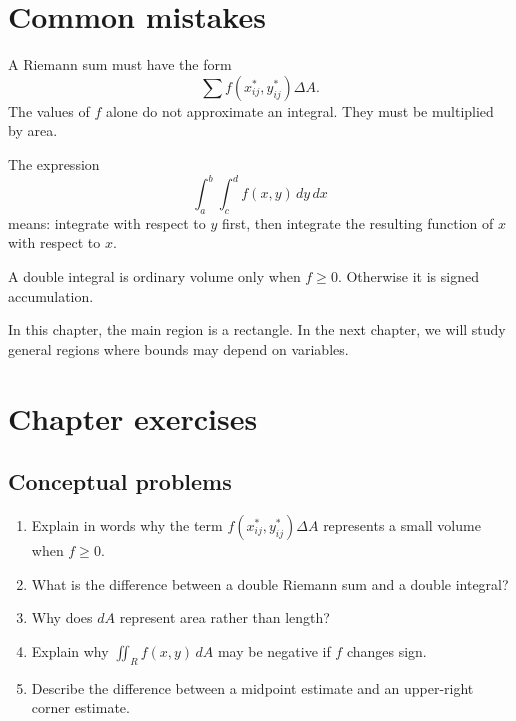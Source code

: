 \documentclass[11pt]{article}
\newcommand{\dA}{\,dA}
\newcommand{\dd}{\,d}
\begin{document}
\section{Common mistakes}

\begin{warningbox}
A Riemann sum must have the form
\[
\sum f(x_{ij}^*,y_{ij}^*)\Delta A.
\]
The values of $f$ alone do not approximate an integral. They must be multiplied by area.
\end{warningbox}

\begin{warningbox}
The expression
\[
\int_a^b\int_c^d f(x,y)\dd y\dd x
\]
means: integrate with respect to $y$ first, then integrate the resulting function of $x$ with respect to $x$.
\end{warningbox}

\begin{warningbox}
A double integral is ordinary volume only when $f\ge 0$. Otherwise it is signed accumulation.
\end{warningbox}

\begin{warningbox}
In this chapter, the main region is a rectangle. In the next chapter, we will study general regions where bounds may depend on variables.
\end{warningbox}

\section{Chapter exercises}

\subsection*{Conceptual problems}
\begin{enumerate}
  \item Explain in words why the term $f(x_{ij}^*,y_{ij}^*)\Delta A$ represents a small volume when $f\ge 0$.
  \item What is the difference between a double Riemann sum and a double integral?
  \item Why does $dA$ represent area rather than length?
  \item Explain why $\iint_R f(x,y)\dA$ may be negative if $f$ changes sign.
  \item Describe the difference between a midpoint estimate and an upper-right corner estimate.
\end{enumerate}
\end{document}
